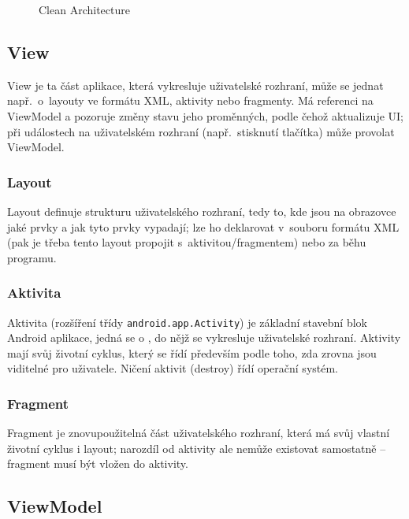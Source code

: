 \documentclass[twoside]{ctuthesis}
\begin{document}
\begin{figure}[h!]
	
	\caption{Clean Architecture}
	\label{fig:clean-architecture}
\end{figure}


\subsection{View}

View je ta část aplikace, která vykresluje uživatelské rozhraní, může se jednat např.~o~layouty ve formátu XML, aktivity nebo fragmenty. Má referenci na ViewModel a pozoruje změny stavu jeho proměnných, podle čehož aktualizuje UI; při událostech na uživatelském rozhraní (např.~stisknutí tlačítka) může provolat ViewModel.

\subsubsection{Layout}

Layout definuje strukturu uživatelského rozhraní, tedy to, kde jsou na obrazovce jaké prvky a jak tyto prvky vypadají; lze ho deklarovat v~souboru formátu XML (pak je třeba tento layout propojit s~aktivitou/fragmentem) nebo za běhu programu. \cite{android2020layouts}

\subsubsection{Aktivita}

Aktivita (rozšíření třídy \texttt{android.app.Activity}) je základní stavební blok Android aplikace, jedná se o , do nějž se vykresluje uživatelské rozhraní. Aktivity mají svůj životní cyklus, který se řídí především podle toho, zda zrovna jsou viditelné pro uživatele. Ničení aktivit (destroy) řídí operační systém. \cite{android2020activity}

\subsubsection{Fragment}

Fragment je znovupoužitelná část uživatelského rozhraní, která má svůj vlastní životní cyklus i layout; narozdíl od aktivity ale nemůže existovat samostatně -- fragment musí být vložen do aktivity. \cite{android2020fragments}

\subsection{ViewModel}
\end{document}
